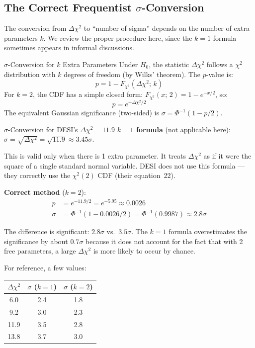 \documentclass[11pt,a4paper]{article}
\begin{document}
\subsection{The Correct Frequentist $\sigma$-Conversion}
\label{sec:sigma_correct}

The conversion from $\Delta\chi^2$ to ``number of sigma'' depends on the number of extra parameters $k$. We review the proper procedure here, since the $k=1$ formula sometimes appears in informal discussions.

\begin{conceptbox}{$\sigma$-Conversion for $k$ Extra Parameters}
Under $H_0$, the statistic $\Delta\chi^2$ follows a $\chi^2$ distribution with $k$ degrees of freedom (by Wilks' theorem). The $p$-value is:
\begin{equation}
p = 1 - F_{\chi^2}(\Delta\chi^2;\, k)
\end{equation}
For $k = 2$, the CDF has a simple closed form: $F_{\chi^2}(x;\, 2) = 1 - e^{-x/2}$, so:
\begin{equation}
p = e^{-\Delta\chi^2/2}
\end{equation}
The equivalent Gaussian significance (two-sided) is $\sigma = \Phi^{-1}(1 - p/2)$.
\end{conceptbox}

\begin{examplebox}{$\sigma$-Conversion for DESI's $\Delta\chi^2 = 11.9$}
\textbf{$k=1$ formula} (not applicable here): $\sigma = \sqrt{\Delta\chi^2} = \sqrt{11.9} \approx 3.45\sigma$.

This is valid only when there is 1 extra parameter. It treats $\Delta\chi^2$ as if it were the square of a single standard normal variable. DESI does not use this formula --- they correctly use the $\chi^2(2)$ CDF (their equation~22).

\textbf{Correct method} ($k=2$):
\begin{align}
p &= e^{-11.9/2} = e^{-5.95} \approx 0.0026 \\
\sigma &= \Phi^{-1}(1 - 0.0026/2) = \Phi^{-1}(0.9987) \approx 2.8\sigma
\end{align}

The difference is significant: $2.8\sigma$ vs.\ $3.5\sigma$. The $k=1$ formula overestimates the significance by about $0.7\sigma$ because it does not account for the fact that with 2 free parameters, a large $\Delta\chi^2$ is more likely to occur by chance.

For reference, a few values:
\begin{center}
\begin{tabular}{ccc}
\toprule
$\Delta\chi^2$ & $\sigma$ ($k=1$) & $\sigma$ ($k=2$) \\
\midrule
6.0 & 2.4 & 1.8 \\
9.2 & 3.0 & 2.3 \\
11.9 & 3.5 & 2.8 \\
13.8 & 3.7 & 3.0 \\
\bottomrule
\end{tabular}
\end{center}
\end{examplebox}
\end{document}
